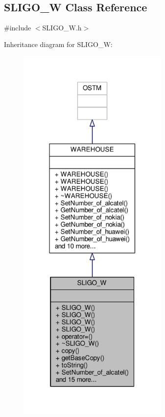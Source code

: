 \hypertarget{class_s_l_i_g_o___w}{}\subsection{S\+L\+I\+G\+O\+\_\+W Class Reference}
\label{class_s_l_i_g_o___w}


{\ttfamily \#include $<$S\+L\+I\+G\+O\+\_\+\+W.\+h$>$}



Inheritance diagram for S\+L\+I\+G\+O\+\_\+W\+:
\nopagebreak
\begin{figure}[H]
\begin{center}
\leavevmode
\includegraphics[width=211pt]{class_s_l_i_g_o___w__inherit__graph}
\end{center}
\end{figure}


